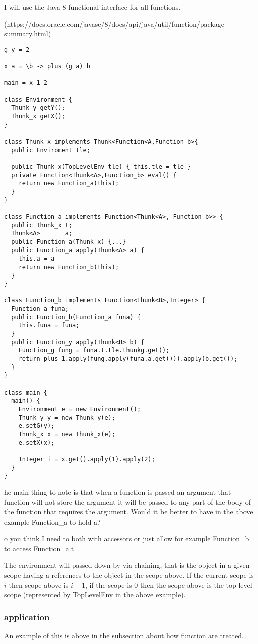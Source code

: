 \documentclass[12pt,a4paper,twoside]{article}
\def\comment#1\done{{\color{blue}#1}}
\begin{document}
I will use the Java 8 functional interface for all functions.

(https://docs.oracle.com/javase/8/docs/api/java/util/function/package-summary.html)

\begin{verbatim}
g y = 2
  
x a = \b -> plus (g a) b

main = x 1 2

class Environment {
  Thunk_y getY();
  Thunk_x getX();
}

class Thunk_x implements Thunk<Function<A,Function_b>{
  public Enviroment tle;

  public Thunk_x(TopLevelEnv tle) { this.tle = tle }
  private Function<Thunk<A>,Function_b> eval() {
    return new Function_a(this);
  }
}

class Function_a implements Function<Thunk<A>, Function_b>> {
  public Thunk_x t; 
  Thunk<A>       a;
  public Function_a(Thunk_x) {...}
  public Function_a apply(Thunk<A> a) {
    this.a = a
    return new Function_b(this);
  }
}

class Function_b implements Function<Thunk<B>,Integer> {
  Function_a funa;
  public Function_b(Function_a funa) {
    this.funa = funa;
  }
  public Function_y apply(Thunk<B> b) {
    Function_g fung = funa.t.tle.thunkg.get();
    return plus_1.apply(fung.apply(funa.a.get())).apply(b.get());
  }
}

class main {
  main() {
    Environment e = new Environment();
    Thunk_y y = new Thunk_y(e);
    e.setG(y);
    Thunk_x x = new Thunk_x(e);
    e.setX(x);

    Integer i = x.get().apply(1).apply(2);
  }
}
\end{verbatim}

\comment The main thing to note is that when a function is passed an argument that function will not store the argument it will be
passed to any part of the body of the function that requires the argument. Would it be better to have in the above 
example Function\_a to hold a?\done

\comment Do you think I need to both with accessors or just allow for example Function\_b to access Function\_a.t\done

The environment will passed down by via chaining, that is the object in a given scope
having a references to the object in the scope above. If the current scope is $i$ then scope above is
$i-1$, if the scope is $0$ then the scope above is the top level scope (represented by TopLevelEnv in the above example).


\subsubsection{application}

An example of this is above in the subsection about how function are treated.
\end{document}
